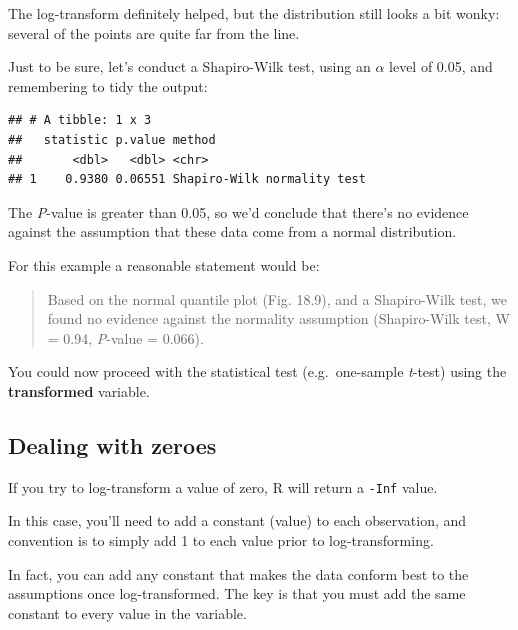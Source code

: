 \documentclass[
]{book}
\newenvironment{Shaded}{\begin{snugshade}}{\end{snugshade}}
\newcommand{\FunctionTok}[1]{\textcolor[rgb]{0.13,0.29,0.53}{\textbf{#1}}}
\newcommand{\NormalTok}[1]{#1}
\newcommand{\OtherTok}[1]{\textcolor[rgb]{0.56,0.35,0.01}{#1}}
\newcommand{\SpecialCharTok}[1]{\textcolor[rgb]{0.81,0.36,0.00}{\textbf{#1}}}
\begin{document}
The log-transform definitely helped, but the distribution still looks a bit wonky: several of the points are quite far from the line.

Just to be sure, let's conduct a Shapiro-Wilk test, using an \(\alpha\) level of 0.05, and remembering to tidy the output:

\begin{Shaded}
\end{Shaded}

\begin{verbatim}
## # A tibble: 1 x 3
##   statistic p.value method                     
##       <dbl>   <dbl> <chr>                      
## 1    0.9380 0.06551 Shapiro-Wilk normality test
\end{verbatim}

The \emph{P}-value is greater than 0.05, so we'd conclude that there's no evidence against the assumption that these data come from a normal distribution.

For this example a reasonable statement would be:

\begin{quote}
Based on the normal quantile plot (Fig. 18.9), and a Shapiro-Wilk test, we found no evidence against the normality assumption (Shapiro-Wilk test, W = 0.94, \emph{P}-value = 0.066).
\end{quote}

You could now proceed with the statistical test (e.g.~one-sample \emph{t}-test) using the \textbf{transformed} variable.

\subsection{Dealing with zeroes}\label{zeroes}

If you try to log-transform a value of zero, R will return a \texttt{-Inf} value.

In this case, you'll need to add a constant (value) to each observation, and convention is to simply add 1 to each value prior to log-transforming.

In fact, you can add any constant that makes the data conform best to the assumptions once log-transformed. The key is that you must add the same constant to every value in the variable.
\end{document}
